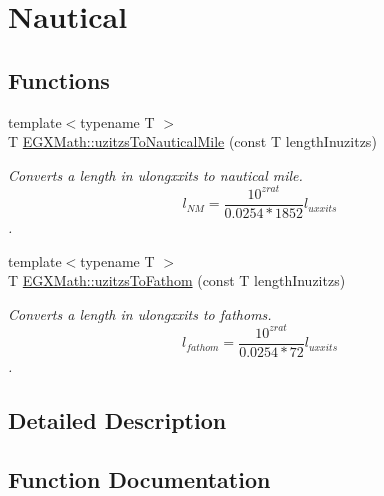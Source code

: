 \hypertarget{group___e_g_x_math-_conversions-_length_conversions-_non-_s_i-uzitzs-_nautical}{}\section{Nautical}
\label{group___e_g_x_math-_conversions-_length_conversions-_non-_s_i-uzitzs-_nautical}
\subsection*{Functions}
\begin{DoxyCompactItemize}
\item 
{\footnotesize template$<$typename T $>$ }\\T \mbox{\hyperlink{group___e_g_x_math-_conversions-_length_conversions-_non-_s_i-uzitzs-_nautical_ga71c06fc85e22f77eba0b234edefa4562}{E\+G\+X\+Math\+::uzitzs\+To\+Nautical\+Mile}} (const T length\+Inuzitzs)
\begin{DoxyCompactList}\small\item\em Converts a length in ulongxxits to nautical mile. \[ l_{NM}= \frac{10^{zrat}}{0.0254 * 1852} l_{uxxits} \]. \end{DoxyCompactList}\item 
{\footnotesize template$<$typename T $>$ }\\T \mbox{\hyperlink{group___e_g_x_math-_conversions-_length_conversions-_non-_s_i-uzitzs-_nautical_gaaff17ba6c6a9c899108fccf746059d03}{E\+G\+X\+Math\+::uzitzs\+To\+Fathom}} (const T length\+Inuzitzs)
\begin{DoxyCompactList}\small\item\em Converts a length in ulongxxits to fathoms. \[ l_{fathom}= \frac{10^{zrat}}{0.0254 * 72} l_{uxxits} \]. \end{DoxyCompactList}\end{DoxyCompactItemize}


\subsection{Detailed Description}


\subsection{Function Documentation}
\mbox{\label{group___e_g_x_math-_conversions-_length_conversions-_non-_s_i-uzitzs-_nautical_gaaff17ba6c6a9c899108fccf746059d03}} 
